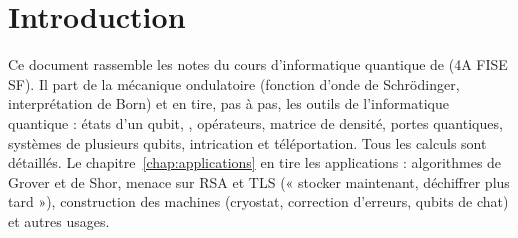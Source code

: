 
\providecommand{\ket}[1]{|#1\rangle}
\providecommand{\bra}[1]{\langle #1|}
\providecommand{\braket}[2]{\langle #1|#2\rangle}

\section*{Introduction}

Ce document rassemble les notes du cours d'informatique quantique de \docprof{}
(4A FISE SF). Il part de la mécanique ondulatoire (fonction d'onde de Schrödinger,
interprétation de Born) et en tire, pas à pas, les outils de l'informatique
quantique : états d'un \gls{qubit}, , opérateurs,
matrice de densité, portes quantiques, systèmes de plusieurs qubits,
\gls{intrication} et téléportation. Tous les calculs sont détaillés. Le chapitre~\ref{chap:applications} en tire les applications :
algorithmes de Grover et de Shor, menace sur RSA et TLS (« stocker maintenant, déchiffrer plus tard »), construction
des machines (cryostat, correction d'erreurs, qubits de chat) et autres usages.

